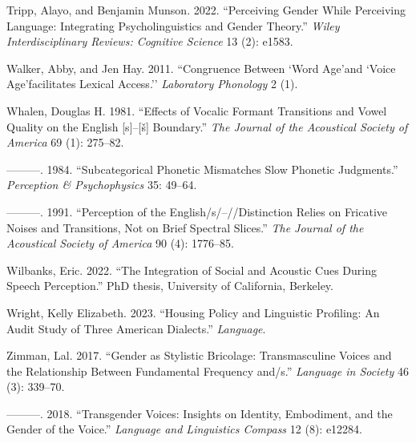 \documentclass[
  letterpaper,
  DIV=11,
  numbers=noendperiod]{scrartcl}
\newlength{\cslhangindent}
\newenvironment{CSLReferences}[2] %
 {\begin{list}{}{%
  \setlength{\itemindent}{0pt}
  \setlength{\leftmargin}{0pt}
  \setlength{\parsep}{0pt}
  \ifodd #1
   \setlength{\leftmargin}{\cslhangindent}
   \setlength{\itemindent}{-1\cslhangindent}
  \fi
  \setlength{\itemsep}{#2\baselineskip}}}
 {\end{list}}
\begin{document}
\begin{CSLReferences}{1}{0}
Tripp, Alayo, and Benjamin Munson. 2022. {``Perceiving Gender While
Perceiving Language: Integrating Psycholinguistics and Gender Theory.''}
\emph{Wiley Interdisciplinary Reviews: Cognitive Science} 13 (2): e1583.

Walker, Abby, and Jen Hay. 2011. {``Congruence Between `Word Age'and
`Voice Age'facilitates Lexical Access.''} \emph{Laboratory Phonology} 2
(1).

Whalen, Douglas H. 1981. {``Effects of Vocalic Formant Transitions and
Vowel Quality on the English {[}s{]}--{[}{š}{]} Boundary.''} \emph{The
Journal of the Acoustical Society of America} 69 (1): 275--82.

---------. 1984. {``Subcategorical Phonetic Mismatches Slow Phonetic
Judgments.''} \emph{Perception \& {Psychophysics}} 35: 49--64.

---------. 1991. {``Perception of the English/s/--/\int{}/Distinction
Relies on Fricative Noises and Transitions, Not on Brief Spectral
Slices.''} \emph{The Journal of the Acoustical Society of America} 90
(4): 1776--85.

Wilbanks, Eric. 2022. {``The Integration of Social and Acoustic Cues
During Speech Perception.''} PhD thesis, University of California,
Berkeley.

Wright, Kelly Elizabeth. 2023. {``Housing Policy and Linguistic
Profiling: An Audit Study of Three American Dialects.''}
\emph{Language}.

Zimman, Lal. 2017. {``Gender as Stylistic Bricolage: Transmasculine
Voices and the Relationship Between Fundamental Frequency and/s.''}
\emph{Language in Society} 46 (3): 339--70.

---------. 2018. {``Transgender Voices: Insights on Identity,
Embodiment, and the Gender of the Voice.''} \emph{Language and
Linguistics Compass} 12 (8): e12284.

\end{CSLReferences}
\end{document}
